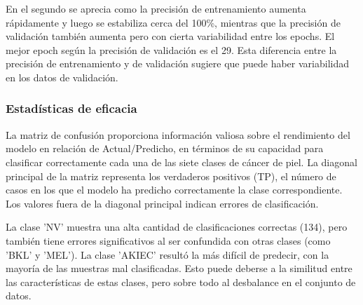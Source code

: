 En el segundo se aprecia como la precisión de entrenamiento aumenta rápidamente y luego se estabiliza cerca del 100\%, mientras que la precisión de validación también aumenta pero con cierta variabilidad entre los epochs. El mejor epoch según la precisión de validación es el 29. Esta diferencia entre la precisión de entrenamiento y de validación sugiere que puede haber variabilidad en los datos de validación.

	\subsubsection{Estadísticas de eficacia}\label{sub:accuracy_statistic_p1}
    La matriz de confusión proporciona información valiosa sobre el rendimiento del modelo en relación de Actual/Predicho, en términos de su capacidad para clasificar correctamente cada una de las siete clases de cáncer de piel. La diagonal principal de la matriz representa los verdaderos positivos (TP), el número de casos en los que el modelo ha predicho correctamente la clase correspondiente. Los valores fuera de la diagonal principal indican errores de clasificación.

    La clase 'NV' muestra una alta cantidad de clasificaciones correctas (134), pero también tiene errores significativos al ser confundida con otras clases (como 'BKL' y 'MEL'). La clase 'AKIEC' resultó la más difícil de predecir, con la mayoría de las muestras mal clasificadas. Esto puede deberse a la similitud entre las características de estas clases, pero sobre todo al desbalance en el conjunto de datos.
    
